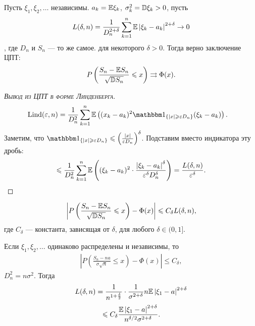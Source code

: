 \documentclass[../main.tex]{subfiles}
\begin{document}
\begin{thm}
 Пусть $ \xi_1, \xi_2, \ldots $ независимы. $ a_k = \mathbb E \xi_k $, $ \sigma_k^{2} = \mathbb D \xi_k > 0 $, пусть
 \begin{align*}
  L(\delta, n) = \frac{1}{D_n^{2+\delta}} \sum_{k=1}^{n} \mathbb E \left| \xi_k - a_k \right|^{2 + \delta} \to 0
 \end{align*}, где $ D_n $ и $ S_n $ --- то же самое. для некоторого $ \delta  > 0 $. Тогда верно заключение ЦПТ:
 \begin{align*}
  P \left( \frac{S_n - \mathbb E S_n}{\sqrt{\mathbb D S_n}} \leqslant x \right) \rightrightarrows \Phi(x).
 \end{align*}
\end{thm}
\begin{proof}[\normalfont\textsc{Вывод из ЦПТ в форме Линденберга}]
 \begin{align*}
  \mathrm{Lind}(\eps, n) &= \frac{1}{D_n^{2}} \sum_{k=1}^{n} \E \left( (x_k-a_k)^{2}\Ind_{\left\{ \left| x \right| \geqslant \eps D_n\right\}}(\xi_k - a_k) \right).
 \end{align*} Заметим, что $ \Ind_{\left\{ \left| x \right| \geqslant \eps D_n \right\}} \leqslant \left(\frac{\left| x \right|}{\eps D_n} \right)^{\delta} $. Подставим вместо индикатора эту дробь:
 \begin{align*}
    \leqslant \frac{1}{D_n^{2}} \sum_{k=1}^{n} \mathbb E \left( (\xi_k-a_k)^{2} \cdot \frac{\left| \xi_k-a_k \right|^{\delta}}{\varepsilon^{\delta} D_n^{\delta}} \right) = \frac{L(\delta, n)}{\varepsilon^{\delta}}.
 \end{align*} 
\end{proof}
\begin{thm}
 \begin{align*}
  \left| P \left( \frac{S_n-\mathbb E S_n}{\sqrt{\mathbb D S_n}} \leqslant x\right) - \Phi(x) \right| \leqslant C_\delta L(\delta, n),
 \end{align*} где $ C_\delta $ --- константа, зависящая от $ \delta $, для любого $ \delta \in (0, 1] $.
\end{thm}
\begin{crly}
 Если $ \xi_1, \xi_2, \ldots $  одинаково распределены и независимы, то
 \begin{align*}
  \left| P \left( \frac{S_n - na}{\sigma \sqrt n} \leqslant x \right) - \Phi(x) \right| \leqslant C_\delta,
 \end{align*} $ D_n^{2} = n\sigma^{2} $. Тогда
 \begin{align*}
  L(\delta, n) = \frac{1}{n^{1 + \frac{\delta}{2}}} \cdot \frac{1}{\sigma^{2 + \delta}} n \mathbb E \left| \xi_1 - a \right|^{2 + \delta}
 \end{align*}
 \begin{align*}
  \leqslant C_\delta \frac{\mathbb E \left| \xi_1 - a \right|^{2+\delta}}{n^{\delta / 2} \sigma^{2 + \delta}}.
 \end{align*}
\end{crly}
\end{document}
